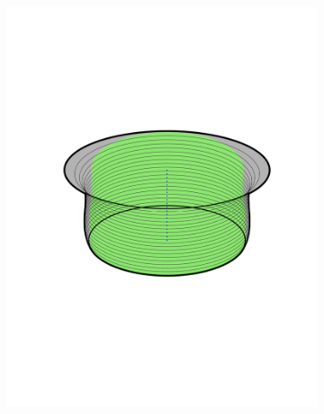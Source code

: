 \begin{figure}
\begin{subfigure}[b]{0.3\textwidth}
    \includegraphics[width=\textwidth]{figures/method/FunnelSimnew1}
  \end{subfigure}
  \begin{subfigure}[b]{0.3\textwidth}

\end{subfigure}
\end{figure}
